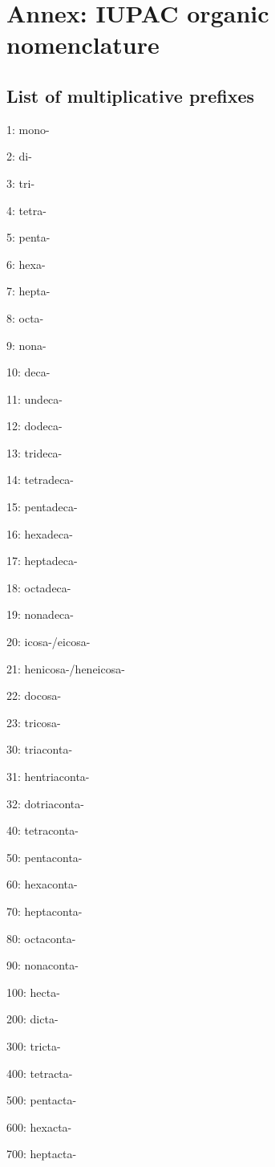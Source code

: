 \clearpage
\chapter{Annex: IUPAC organic nomenclature}
\section{List of multiplicative prefixes}

1: mono-

2: di-

3: tri-

4: tetra-

5: penta-

6: hexa-

7: hepta-

8: octa-

9: nona-

10: deca-

11: undeca-

12: dodeca-

13: trideca-

14: tetradeca-

15: pentadeca-

16: hexadeca-

17: heptadeca-

18: octadeca-

19: nonadeca-

20: icosa-/eicosa-

21: henicosa-/heneicosa-

22: docosa-

23: tricosa-

30: triaconta-

31: hentriaconta-

32: dotriaconta-

40: tetraconta-

50: pentaconta-

60: hexaconta-

70: heptaconta-

80: octaconta-

90: nonaconta-

100: hecta-

200: dicta-

300: tricta-

400: tetracta-

500: pentacta-

600: hexacta-

700: heptacta-

